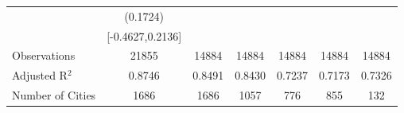 \documentclass{article}
\begin{document}
\begin{table}[htbp]
\begin{tabular}{l*{6}{c}}
                    &    (0.1724)   &               &               &               &               &               \\
                    &[-0.4627,0.2136]   &               &               &               &               &               \\
\midrule
Observations        &       21855   &       14884   &       14884   &       14884   &       14884   &       14884   \\
Adjusted R$^2$      &      0.8746   &      0.8491   &      0.8430   &      0.7237   &      0.7173   &      0.7326   \\
Number of Cities    &        1686   &        1686   &        1057   &         776   &         855   &         132   \\
\bottomrule
\end{tabular}
\end{table}
\end{document}
